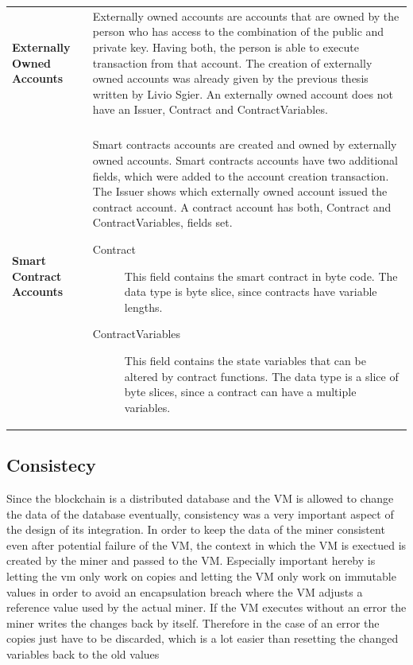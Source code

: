 \begin{tabular}[t]{ p{3cm} p{12.5cm}}
\raggedright
\textbf{Externally Owned Accounts} &
Externally owned accounts are accounts that are owned by the person who has access to the combination of the public and private key. Having both, the person is able to execute transaction from that account. The creation of externally owned accounts was already given by the previous thesis written by Livio Sgier. An externally owned account does not have an Issuer, Contract and ContractVariables. \\ \\
\textbf{Smart Contract Accounts} &
Smart contracts accounts are created and owned by externally owned accounts. Smart contracts accounts have two additional fields, which were added to the account creation transaction. The Issuer shows which externally owned account issued the contract account. A contract account has both, Contract and ContractVariables, fields set.

	\begin{description}
  		\item[Contract] This field contains the smart contract in byte code. The data type is byte slice, since contracts have variable lengths.
  		\item[ContractVariables] This field contains the state variables that can be altered by contract functions. The data type is a slice of byte slices, since a contract can have a multiple variables.
	\end{description}
\end{tabular}

\subsection{Consistecy}
Since the blockchain is a distributed database and the VM is allowed to change the data of the database eventually, consistency was a very important aspect of the design of its integration. In order to keep the data of the miner consistent even after potential failure of the VM, the context in which the VM is exectued is created by the miner and passed to the VM. Especially important hereby is letting the vm only work on copies and letting the VM only work on immutable values in order to avoid an encapsulation breach where the VM adjusts a reference value used by the actual miner. If the VM executes without an error the miner writes the changes back by itself. Therefore in the case of an error the copies just have to be discarded, which is a lot easier than resetting the changed variables back to the old values

